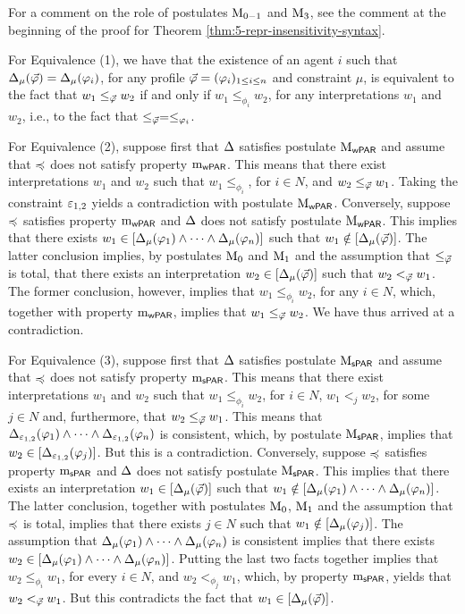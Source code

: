 \begin{prf*}{}{}%
	For a comment on the role of postulates $\ppm{0-1}$ and $\ppm{3}$, 
	see the comment at the beginning of the proof for Theorem \ref{thm:5-repr-insensitivity-syntax}.

	For Equivalence (1), we have that the existence of an agent $i$ 
	such that $\me_{\mu}(\P)=\me_{\mu}(\phi_{i})$,
	for any profile $\P=(\phi_i)_{1\le i \le n}$ and constraint $\mu$,
	is equivalent to the fact that 
	$w_1 \le_{\P}w_2$ if and only if $w_1 \le_{\phi_{i}}w_2$, for any interpretations $w_1$ and $w_2$,
	i.e., to the fact that $\le_{\P} = \le_{\phi_{i}}$.

	For Equivalence (2), suppose first that $\me$ satisfies postulate $\ppm{\WPRT}$ 
	and assume that $\as$ does not satisfy property $\oom{\WPRT}$.
	This means that there exist interpretations $w_1$ and $w_2$
	such that $w_1 \le_{\phi_{i}}$, for $i\in N$, and $w_2 \le_{\P}w_1$. 
	Taking the constraint $\px_{1,2}$ yields a contradiction with postulate $\ppm{\WPRT}$.
	Conversely, suppose $\as$ satisfies property $\oom{\WPRT}$ and $\me$ does not satisfy
	postulate $\ppm{\WPRT}$. This implies that there exists 
	$w_1\in[\me_{\mu}(\phi_{1})\land\dots\land \me_{\mu}(\phi_{n})]$
	such that $w_1\notin[\me_{\mu}(\P)]$.
	The latter conclusion implies,
	by postulates $\ppm{0}$ and $\ppm{1}$ and the assumption that 
	$\le_{\P}$ is total,
	that there exists an interpretation $w_2\in[\me_{\mu}(\P)]$
	such that $w_2 <_{\P}w_1$. 
	The former conclusion, however, implies that $w_1 \le_{\phi_{i}} w_2$, 
	for any $i\in N$,
	which, together with property $\oom{\WPRT}$, implies that $w_1 \le_{\P} w_2$.
	We have thus arrived at a contradiction.

	For Equivalence (3), suppose first that $\me$ satisfies postulate $\ppm{\SPRT}$ 
	and assume that $\as$ does not satisfy property $\oom{\SPRT}$.
	This means that there exist interpretations $w_1$ and $w_2$
	such that $w_1 \le_{\phi_{i}} w_2$, for $i\in N$, $w_1 <_{j}w_2$,
	for some $j\in N$ and, furthermore, that $w_2 \le_{\P} w_1$.
	This means that 
	$\me_{\px_{1,2}}(\phi_{1})\land\dots\land \me_{\px_{1,2}}(\phi_{n})$
	is consistent, which, by postulate $\ppm{\SPRT}$, implies that 
	$w_2\in[\me_{\px_{1,2}}(\phi_{j})]$.
	But this is a contradiction. 
	Conversely, suppose $\as$ satisfies property $\oom{\SPRT}$ and $\me$ does not satisfy
	postulate $\ppm{\SPRT}$. This implies that there exists an interpretation 
	$w_1\in[\me_{\mu}(\P)]$ such that $w_1\notin[\me_{\mu}(\phi_{1})\land\dots\land \me_{\mu}(\phi_{n})]$.
	The latter conclusion,
	together with postulates $\ppm{0}$, $\ppm{1}$ and the assumption that $\as$ is total,
	implies that there exists $j\in N$ such that 
	$w_1\notin[\me_{\mu}(\phi_{j})]$.
	The assumption that $\me_{\mu}(\phi_{1})\land\dots\land \me_{\mu}(\phi_{n})$
	is consistent implies that there exists $w_2\in[\me_{\mu}(\phi_{1})\land\dots\land \me_{\mu}(\phi_{n})]$.
	Putting the last two facts together implies that 
	$w_2\le_{\phi_i}w_1$, for every $i\in N$, and $w_2<_{\phi_{j}}w_1$,
	which, by property $\oom{\SPRT}$, yields that $w_2<_{\P}w_1$.
	But this contradicts the fact that $w_1\in[\me_{\mu}(\P)]$.


\end{prf*}
